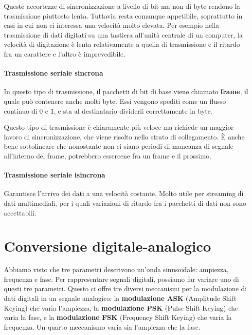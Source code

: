            Queste accortezze di sincronizzazione a livello di bit ma non di byte rendono la trasmissione piuttosto lenta. Tuttavia resta comunque appetibile, soprattutto in casi in cui non ci interessa una velocità molto elevata. Per esempio nella trasmissione di dati digitati su una tastiera all'unità centrale di un computer, la velocità di digitazione è lenta relativamente a quella di trasmissione e il ritardo fra un carattere e l'altro è imprevedibile.
            
        \paragraph{Trasmissione seriale sincrona}
            In questo tipo di trasmissione, il pacchetti di bit di base viene chiamato \textbf{frame}, il quale può contenere anche molti byte. Essi vengono spediti come un flusso continuo di 0 e 1, e sta al destinatario dividerli correttamente in byte.
            
            Questo tipo di trasmissione è chiaramente più veloce ma richiede un maggior lavoro di sincronizzazione, che viene risolto nello strato di collegamento. È anche bene sottolineare che nonostante non ci siano periodi di mancanza di segnale all'interno del frame, potrebbero essercene fra un frame e il prossimo.
            
        \paragraph{Trasmissione seriale isincrona}
            Garantisce l'arrivo dei dati a una velocità costante. Molto utile per streaming di dati multimediali, per i quali variazioni di ritardo fra i pacchetti di dati non sono accettabili.
            
\section{Conversione digitale-analogico}
    Abbiamo visto che tre parametri descrivono un'onda sinusoidale: ampiezza, frequenza e fase. Per rappresentare segnali digitali, possiamo far variare uno di questi tre parametri. Questo ci offre tre diversi meccanismi per la modulazione di dati digitali in un segnale analogico: la \textbf{modulazione ASK} (Amplitude Shift Keying) che varia l'ampiezza, la \textbf{modulazione PSK} (Pulse Shift Keying) che varia la fase, e la \textbf{modulazione FSK} (Frequency Shift Keying) che varia la frequenza. Un quarto meccanismo varia sia l'ampiezza che la fase.
    
